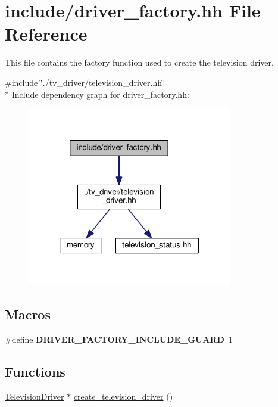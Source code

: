 \hypertarget{driver__factory_8hh}{\section{include/driver\+\_\+factory.hh File Reference}
\label{driver__factory_8hh}
}


This file contains the factory function used to create the television driver.  


{\ttfamily \#include \char`\"{}./tv\+\_\+driver/television\+\_\+driver.\+hh\char`\"{}}\\*
Include dependency graph for driver\+\_\+factory.\+hh\+:
\nopagebreak
\begin{figure}[H]
\begin{center}
\leavevmode
\includegraphics[width=254pt]{driver__factory_8hh__incl}
\end{center}
\end{figure}
\subsection*{Macros}
\begin{DoxyCompactItemize}
\item 
\hypertarget{driver__factory_8hh_a3960ae721ce97d89c42f711cf2b1f2a2}{\#define {\bfseries D\+R\+I\+V\+E\+R\+\_\+\+F\+A\+C\+T\+O\+R\+Y\+\_\+\+I\+N\+C\+L\+U\+D\+E\+\_\+\+G\+U\+A\+R\+D}~1}\label{driver__factory_8hh_a3960ae721ce97d89c42f711cf2b1f2a2}

\end{DoxyCompactItemize}
\subsection*{Functions}
\begin{DoxyCompactItemize}
\item 
\hyperlink{classTelevisionDriver}{Television\+Driver} $\ast$ \hyperlink{driver__factory_8hh_a87ec6e595e8230b584446fdff67b0db2}{create\+\_\+television\+\_\+driver} ()
\end{DoxyCompactItemize}


